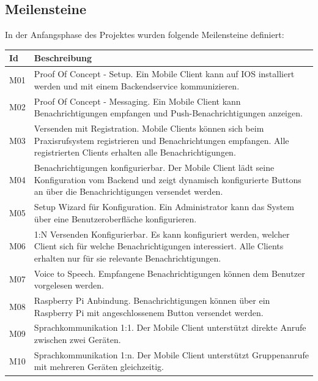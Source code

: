 \clearpage
\subsection{Meilensteine}

In der Anfangsphase des Projektes wurden folgende Meilensteine definiert:

\begin{table}[h]
    \centering
    \begin{tabular}{|l|p{15cm}|}
        \hline
        \textbf{Id} & \textbf{Beschreibung}                                                                                                                                                                                         \\
        \hline
        M01         & Proof Of Concept - Setup. Ein Mobile Client kann auf IOS installiert werden und mit einem Backendservice kommunizieren. \\
        \hline
        M02         & Proof Of Concept - Messaging. Ein Mobile Client kann Benachrichtigungen empfangen und Push-Benachrichtigungen anzeigen. \\
        \hline
        M03         & Versenden mit Registration. Mobile Clients können sich beim Praxisrufsystem registrieren und Benachrichtungen empfangen. Alle registrierten Clients erhalten alle Benachrichtigungen. \\
        \hline
        M04         & Benachrichtigungen konfigurierbar. Der Mobile Client lädt seine Konfiguration vom Backend und zeigt dynamisch konfigurierte Buttons an über die Benachrichtigungen versendet werden.\\
        \hline
        M05         & Setup Wizard für Konfiguration. Ein Administrator kann das System über eine Benutzeroberfläche konfigurieren.  \\
        \hline
        M06         & 1:N Versenden Konfigurierbar. Es kann konfiguriert werden, welcher Client sich für welche Benachrichtigungen interessiert. Alle Clients erhalten nur für sie relevante Benachrichtigungen.  \\
        \hline
        M07         & Voice to Speech. Empfangene Benachrichtigungen können dem Benutzer vorgelesen werden. \\
        \hline
        M08         & Raspberry Pi Anbindung. Benachrichtigungen können über ein Raspberry Pi mit angeschlossenem Button versendet werden. \\
        \hline
        M09         & Sprachkommunikation 1:1. Der Mobile Client unterstützt direkte Anrufe zwischen zwei Geräten. \\
        \hline
        M10         & Sprachkommunikation 1:n. Der Mobile Client unterstützt Gruppenanrufe mit mehreren Geräten gleichzeitig. \\
        \hline
    \end{tabular}\label{tab:milestones}
\end{table}
\clearpage


